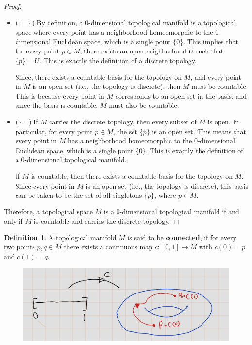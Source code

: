 \documentclass[
]{book}
\theoremstyle{definition}
\newtheorem{definition}{Definition}[chapter]
\theoremstyle{definition}
\theoremstyle{definition}
\theoremstyle{definition}
\theoremstyle{remark}
\begin{document}
\begin{proof}
\leavevmode

\begin{itemize}
\item
  (\(\implies\)) By definition, a 0-dimensional topological manifold is a topological space where every point has a neighborhood homeomorphic to the 0-dimensional Euclidean space, which is a single point \(\{0\}\). This implies that for every point \(p \in M\), there exists an open neighborhood \(U\) such that \(\{p\} = U\). This is exactly the definition of a discrete topology.

  Since, there exists a countable basis for the topology on \(M\), and every point in \(M\) is an open set (i.e., the topology is discrete), then \(M\) must be countable. This is because every point in \(M\) corresponds to an open set in the basis, and since the basis is countable, \(M\) must also be countable.
\item
  (\(\Longleftarrow\)) If \(M\) carries the discrete topology, then every subset of \(M\) is open. In particular, for every point \(p \in M\), the set \(\{p\}\) is an open set. This means that every point in \(M\) has a neighborhood homeomorphic to the 0-dimensional Euclidean space, which is a single point \(\{0\}\). This is exactly the definition of a 0-dimensional topological manifold.

  If \(M\) is countable, then there exists a countable basis for the topology on \(M\). Since every point in \(M\) is an open set (i.e., the topology is discrete), this basis can be taken to be the set of all singletons \(\{p\}\), where \(p \in M\).
\end{itemize}

Therefore, a topological space \(M\) is a 0-dimensional topological manifold if and only if \(M\) is countable and carries the discrete topology.

\end{proof}

\begin{definition}
\protect\hypertarget{def:unnamed-chunk-16}{}\label{def:unnamed-chunk-16}A topological manifold \(M\) is said to be \textbf{connected}, if for every two points \(p, q \in M\) there exists a continuous map \(c : [0, 1] \to M\) with \(c(0) = p\) and \(c(1) = q\).
\end{definition}

\begin{figure}
\centering
\includegraphics{figures/ch1/fig08.png}
\caption{\label{fig:fig08}\(~\)}
\end{figure}
\end{document}
